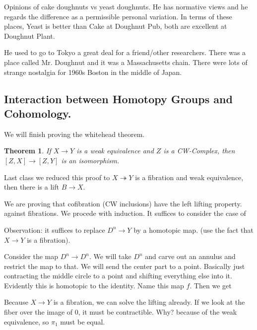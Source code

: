 \documentclass[12pt]{article}
\newtheorem{theorem}{Theorem}[section]
\theoremstyle{definition}
\begin{document}
Opinions of cake doughnuts vs yeast doughnuts. He has normative views and he regards the difference as a permissible personal variation. In terms of these places, Yeast is better than Cake at Doughnut Pub, both are excellent at Doughnut Plant.

He used to go to Tokyo a great deal for a friend/other researchers. There was a place called Mr. Doughnut and it was a Massachusetts chain. There were lots of strange nostalgia for 1960s Boston in the middle of Japan. 

\subsection{Interaction between Homotopy Groups and Cohomology.}
We will finish proving the whitehead theorem. 
\begin{theorem}
	If $X\to Y$ is a weak equivalence and $Z$ is a CW-Complex, then $[Z,X]\to [Z,Y]$ is an isomorphism. 
\end{theorem}
Last class we reduced this proof to $X\twoheadrightarrow Y$ is a fibration and weak equivalence, then there is a lift $B\to X$. \begin{center}
\end{center}
We are proving that cofibration (CW inclusions) have the left lifting property. against fibrations. We procede with induction. It suffices to consider the case of \begin{center}
\end{center}
Observation: it suffices to replace $D^n\to Y$ by a homotopic map.  (use the fact that $X\to Y$ is a fibration). 

Consider the map $D^n\to D^n$. We will take $D^n$ and carve out an annulus and restrict the map to that. We will send the center part to a point. Basically just contracting the middle circle to a point and shifting everything else into it. Evidently this is homotopic to the identity. Name this map $f$. Then we get \begin{center}
\end{center}
Because $X\to Y$ is a fibration, we can solve the lifting already. If we look at the fiber over the image of $0$, it must be contractible. Why? because of the weak equivalence, so $\pi_1$ must be equal. 
\end{document}
